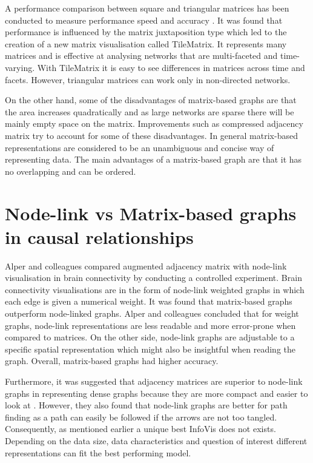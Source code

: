 \documentclass{l4proj}
\begin{document}
A performance comparison between square and triangular matrices has been conducted to measure performance speed and accuracy \cite{liu2015effects}. It was found that performance is influenced by the matrix juxtaposition type which led to the creation of a new matrix visualisation called TileMatrix. It represents many matrices and is effective at analysing networks that are multi-faceted and time-varying. With TileMatrix it is easy to see differences in matrices across time and facets. However, triangular matrices can work only in non-directed networks. 

On the other hand, some of the disadvantages of matrix-based graphs are that the area increases quadratically and as large networks are sparse there will be mainly empty space on the matrix. Improvements such as compressed adjacency matrix try to account for some of these disadvantages. In general matrix-based representations are considered to be an unambiguous and concise way of representing data. The main advantages of a matrix-based graph are that it has no overlapping and can be ordered.

\section{Node-link vs Matrix-based graphs in causal relationships}

Alper and colleagues \cite{alper2013weighted} compared augmented adjacency matrix with node-link visualisation in brain connectivity by conducting a controlled experiment. Brain connectivity visualisations are in the form of node-link weighted graphs in which each edge is given a numerical weight. It was found that matrix-based graphs outperform node-linked graphs. Alper and colleagues concluded that for weight graphs, node-link representations are less readable and more error-prone when compared to matrices. On the other side, node-link graphs are adjustable to a specific spatial representation which might also be insightful when reading the graph. Overall, matrix-based graphs had higher accuracy.  

Furthermore, it was suggested that adjacency matrices are superior to node-link graphs in representing dense graphs because they are more compact and easier to look at \cite{sheny2007path}. However, they also found that node-link graphs are better for path finding as a path can easily be followed if the arrows are not too tangled. Consequently, as mentioned earlier a unique best InfoVis does not exists. Depending on the data size, data characteristics and question of interest different representations can fit the best performing model. 
\end{document}
